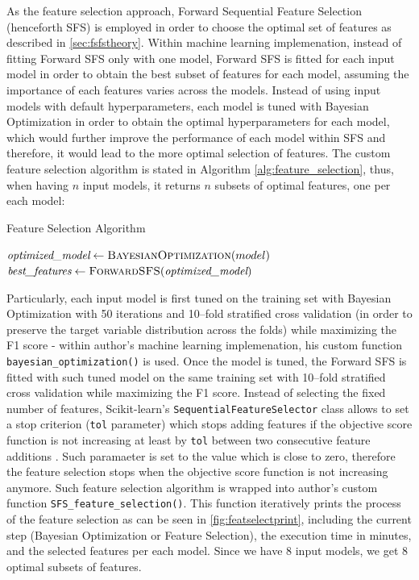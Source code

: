 As the feature selection approach, Forward Sequential Feature Selection (henceforth SFS) is employed in order to choose the optimal set of features as described in \autoref{sec:fsfstheory}.
Within machine learning implemenation, instead of fitting Forward SFS only with one model, Forward SFS is fitted for each input model in order to obtain the best subset of features for each model, assuming the importance of each features varies across the models.
Instead of using input models with default hyperparameters, each model is tuned with Bayesian Optimization in order to obtain the optimal hyperparameters for each model, which would further improve the performance of each model within SFS and therefore, it would lead to the more optimal selection of features.
The custom feature selection algorithm is stated in Algorithm \autoref{alg:feature_selection}, thus, when having $n$ input models, it returns $n$  subsets of optimal features, one per each model:
\begin{algorithm}[H]
\caption{Feature Selection Algorithm}
\label{alg:feature_selection}
\begin{algorithmic}[1]
    \State $\textit{optimized\_model} \gets \textsc{BayesianOptimization}(model)$
    \State $\textit{best\_features} \gets \textsc{ForwardSFS}(\textit{optimized\_model})$
\EndFor
\end{algorithmic}
\end{algorithm}
Particularly, each input model is first tuned on the training set with Bayesian Optimization with 50 iterations and 10--fold stratified cross validation (in order to preserve the target variable distribution across the folds) while maximizing the F1 score - within author's machine learning implemenation, his custom function \lstinline{bayesian_optimization()} is used.
Once the model is tuned, the Forward SFS is fitted with such tuned model on the same training set with 10--fold stratified cross validation while maximizing the F1 score. Instead of selecting the fixed number of features, Scikit-learn's \lstinline{SequentialFeatureSelector} class allows to set a stop criterion (\lstinline{tol} parameter) which stops adding features if the objective score function is not increasing at least by \lstinline{tol} between two consecutive feature additions \citep{sfs}.
Such paramaeter is set to the value which is close to zero, therefore the feature selection stops when the objective score function is not increasing anymore.
\newpage
Such feature selection algorithm is wrapped into author's custom function \lstinline{SFS_feature_selection()}.
This function iteratively prints the process of the feature selection as can be seen in \autoref{fig:featselectprint}, including the current step (Bayesian Optimization or Feature Selection), the execution time in minutes, and the selected features per each model. Since we have 8 input models, we get 8 optimal subsets of features.

